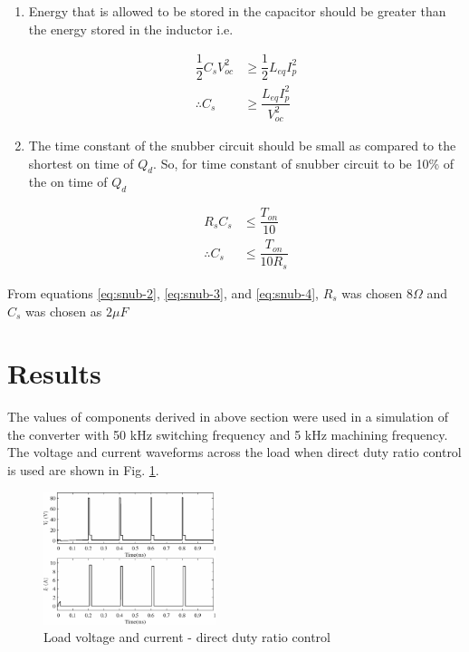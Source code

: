 \documentclass[a4paper]{IEEEtran}
\begin{document}
	\begin{enumerate}
		\item Energy that is allowed to be stored in the capacitor should be greater than the energy stored in the inductor i.e.

			\begin{align}
				\dfrac{1}{2}C_sV_{oc}^2 &\geq \dfrac{1}{2}L_{eq}I_p^2\\
				\therefore C_s &\geq \dfrac{L_{eq}I_p^2}{V_{oc}^2}
				\label{eq:snub-3}
			\end{align}

		\item The time constant of the snubber circuit should be small as compared to the shortest on time of $Q_d$. So, for time constant of snubber circuit to be 10\% of the on time of $Q_d$

			\begin{align}
				R_sC_s &\leq \dfrac{T_{on}}{10}\\
				\therefore C_s &\leq \dfrac{T_{on}}{10R_s}
				\label{eq:snub-4}
			\end{align}
	\end{enumerate}

	From equations \eqref{eq:snub-2}, \eqref{eq:snub-3}, and \eqref{eq:snub-4}, $R_s$ was chosen $8 \Omega$ and $C_s$ was chosen as $2 \mu F$

\section{Results}
	The values of components derived in above section were used in a simulation of the converter with 50 kHz switching frequency and 5 kHz machining frequency. The voltage and current waveforms across the load when direct duty ratio control is used are shown in Fig. \ref{fig:1b}. 

	\begin{figure}
		\centering
		\includegraphics[width=0.45\textwidth]{load_comp}
		\caption{Load voltage and current - direct duty ratio control}
		\label{fig:1b}
	\end{figure}
\end{document}
